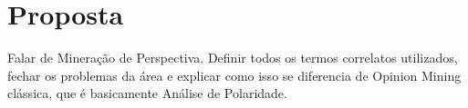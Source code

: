 
\section{Proposta}

Falar de Mineração de Perspectiva. Definir todos os termos correlatos utilizados, fechar os problemas da área e explicar como isso se diferencia de Opinion Mining clássica, que é basicamente Análise de Polaridade.




